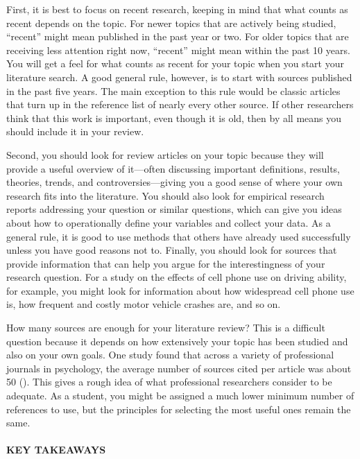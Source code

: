 \documentclass[
]{krantz}
\begin{document}
First, it is best to focus on recent research, keeping in mind that what counts as recent depends on the topic. For newer topics that are actively being studied, ``recent'' might mean published in the past year or two. For older topics that are receiving less attention right now, ``recent'' might mean within the past 10 years. You will get a feel for what counts as recent for your topic when you start your literature search. A good general rule, however, is to start with sources published in the past five years. The main exception to this rule would be classic articles that turn up in the reference list of nearly every other source. If other researchers think that this work is important, even though it is old, then by all means you should include it in your review.

Second, you should look for review articles on your topic because they will provide a useful overview of it---often discussing important definitions, results, theories, trends, and controversies---giving you a good sense of where your own research fits into the literature. You should also look for empirical research reports addressing your question or similar questions, which can give you ideas about how to operationally define your variables and collect your data. As a general rule, it is good to use methods that others have already used successfully unless you have good reasons not to. Finally, you should look for sources that provide information that can help you argue for the interestingness of your research question. For a study on the effects of cell phone use on driving ability, for example, you might look for information about how widespread cell phone use is, how frequent and costly motor vehicle crashes are, and so on.

How many sources are enough for your literature review? This is a difficult question because it depends on how extensively your topic has been studied and also on your own goals. One study found that across a variety of professional journals in psychology, the average number of sources cited per article was about 50 (). This gives a rough idea of what professional researchers consider to be adequate. As a student, you might be assigned a much lower minimum number of references to use, but the principles for selecting the most useful ones remain the same.

\paragraph*{KEY TAKEAWAYS}\label{key-takeaways-26}
\end{document}
